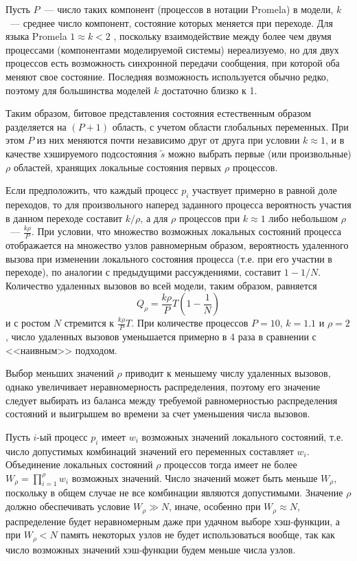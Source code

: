\documentclass[12pt,a4paper,article]{bpm2}
\begin{document}
Пусть $P$~--- число таких компонент (процессов в нотации Promela) в модели, $k$~--- среднее число компонент, состояние которых меняется при переходе. Для языка Promela $1 \approx k < 2$ , поскольку взаимодействие между более чем двумя процессами (компонентами моделируемой системы) нереализуемо, но для двух процессов есть возможность синхронной передачи сообщения, при которой оба меняют свое состояние.
Последняя возможность используется обычно редко, поэтому для большинства моделей $k$ достаточно близко к 1.

Таким образом, битовое представления состояния естественным образом разделяется на $(P+1)$ область, с учетом области глобальных переменных.
При этом $P$ из них меняются почти независимо друг от друга при условии $k \approx 1$, и в качестве хэшируемого подсостояния $\tilde{s}$ можно выбрать первые (или произвольные) $\rho$ областей, хранящих локальные состояния первых $\rho$ процессов.

Если предположить, что каждый процесс $p_i$ участвует примерно в равной доле переходов, то для произвольного наперед заданного процесса вероятность участия в данном переходе составит $k/\rho$, а для $\rho$ процессов при $k \approx 1$ либо небольшом $\rho$~--- $\frac{k \rho}{P}$.
При условии, что множество возможных локальных состояний процесса отображается на множество узлов равномерным образом, вероятность удаленного вызова при изменении локального состояния процесса (т.е. при его участии в переходе), по аналогии с предыдущими рассуждениями, составит $1 - 1/N$. Количество удаленных вызовов во всей модели, таким образом, равняется
\[\label{eq:rpc-partproc}
  Q_\rho = \frac{k \rho}{P} T (1 - \frac{1}{N})
\]
и с ростом $N$ стремится к $\frac{k \rho}{P} T$. При количестве процессов $P = 10$, $k = 1.1$ и $\rho = 2$, число удаленных вызовов уменьшается примерно в 4 раза в сравнении с <<наивным>> подходом.

Выбор меньших значений $\rho$ приводит к меньшему числу удаленных вызовов, однако увеличивает неравномерность распределения, поэтому его значение следует выбирать из баланса между требуемой равномерностью распределения состояний и выигрышем во времени за счет уменьшения числа вызовов.

Пусть $i$-ый процесс $p_i$ имеет $w_i$ возможных значений локального состояний, т.е. число допустимых комбинаций значений его переменных составляет $w_i$.
Объединение локальных состояний $\rho$ процессов тогда имеет не более $W_\rho = \prod_{i=1}^{\rho}{w_i}$ возможных значений.
Число значений может быть меньше $W_\rho$, поскольку в общем случае не все комбинации являются допустимыми.
Значение $\rho$ должно обеспечивать условие $W_\rho \gg N$, иначе, особенно при $W_\rho \approx N$, распределение будет неравномерным даже при удачном выборе хэш-функции, а при $W_\rho < N$ память некоторых узлов не будет использоваться вообще, так как число возможных значений хэш-функции будем меньше числа узлов.
\end{document}
